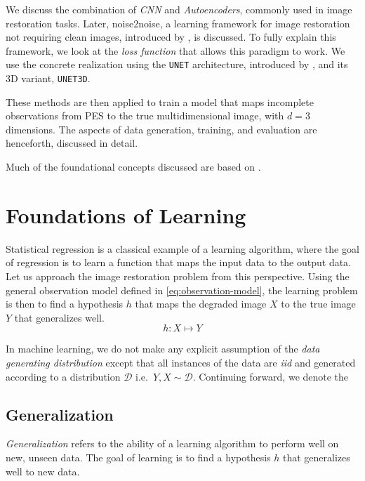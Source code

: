 We discuss the combination of \textit{\gls{CNN}} and \textit{Autoencoders}, commonly used in image restoration tasks. Later, \gls{noise2noise}, a learning framework for image restoration not requiring clean images, introduced by \citeauthor{lehtinenNoise2NoiseLearningImage2018}, is discussed. To fully explain this framework, we look at the \textit{loss function} that allows this paradigm to work. We use the concrete realization using the \texttt{UNET} architecture, introduced by \citeauthor{ronnebergerUNetConvolutionalNetworks}, and its 3D variant, \texttt{UNET3D}.

These methods are then applied to train a model that maps incomplete observations from \gls{PES} to the true multidimensional image, with $d=3$ dimensions. The aspects of data generation, training, and evaluation are henceforth, discussed in detail.

Much of the foundational concepts discussed are based on \cite{shalev-shwartzUnderstandingMachineLearning2014a,jamesIntroductionStatisticalLearning2013,tibshiraniElementsStatisticalLearning,goodfellowDeepLearning2016}.

\section{Foundations of Learning}
Statistical regression is a classical example of a learning algorithm, where the goal of regression is to learn a function that maps the input data to the output data.
Let us approach the image restoration problem from this perspective. Using the general observation model defined in \cref{eq:observation-model}, the learning problem is then to find a hypothesis $h$ that maps the degraded image $X$ to the true image $Y$ that generalizes well.
\begin{equation}
    h: X \mapsto Y
\end{equation}

In machine learning, we do not make any explicit assumption of the \textit{data generating distribution} except that all instances of the data are \textit{\gls{iid}} and generated according to a distribution $\mathcal{D}$ i.e.\ $Y, X \sim \mathcal{D}$. Continuing forward, we denote the

\subsection{Generalization}
\textit{Generalization} refers to the ability of a learning algorithm to perform well on new, unseen data. The goal of learning is to find a hypothesis $h$ that generalizes well to new data. 

